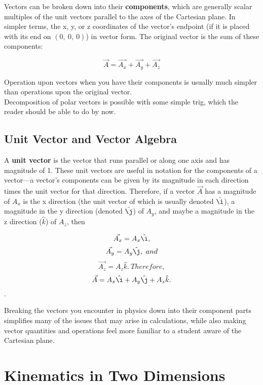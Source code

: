 \documentclass[12pt,letterpaper]{article}
\newcommand{\ihat}{\hat{\i}}
\newcommand{\jhat}{\hat{\j}}
\newcommand{\khat}{\hat{k}}
\begin{document}
Vectors can be broken down into their \textbf{components}, which are generally scalar multiples of the unit vectors parallel to the axes of the Cartesian plane. In simpler terms, the x, y, or z coordinates of the vector's endpoint (if it is placed with its end on $(0,\ 0,\ 0)$) in vector form. The original vector is the sum of these components:

\begin{center}
	$$\vec{A} = \vec{A_{x}} + \vec{A_{y}} + \vec{A_{z}}$$ \linebreak
\end{center}

Operation upon vectors when you have their components is usually much simpler than operations upon the original vector. \\

Decomposition of polar vectors is possible with some simple trig, which the reader should be able to do by now.

\subsection[Unit Vector and Vector Algebra]{Unit Vector and Vector Algebra}

A \textbf{unit vector} is the vector that runs parallel or along one axis and has magnitude of 1. These unit vectors are useful in notation for the components of a vector---a vector's components can be given by its magnitude in each direction times the unit vector for that direction. Therefore, if a vector $\vec{A}$ has a magnitude of $A_{x}$ is the x direction (the unit vector of which is usually denoted $\ihat$), a magnitude in the y direction (denoted $\jhat$) of $A_{y}$, and maybe a magnitude in the z direction ($\khat$) of $A_{z}$, then

\begin{center}
	$$\vec{A_{x}} = A_{x}\ihat,$$
	$$\vec{A_{y}} = A_{y}\jhat,\ and$$
	$$\vec{A_{z}} = A_{z}\khat.\ Therefore,$$
	$$\vec{A} = A_{x}\ihat + A_{y}\jhat + A_{z}\khat.$$. \linebreak
\end{center}

Breaking the vectors you encounter in physics down into their component parts simplifies many of the issues that may arise in calculations, while also making vector quantities and operations feel more familiar to a student aware of the Cartesian plane.

\pagebreak

\section[Kinematics in Two Dimensions]{Kinematics in Two Dimensions}
\end{document}
